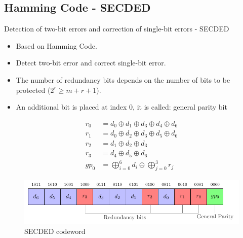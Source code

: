 \subsection{Hamming Code - SECDED}
\begin{frame}{Detection of two-bit errors and correction of single-bit errors - SECDED}
    \begin{block}{}
        \begin{itemize}
            \justifying
            \item Based on Hamming Code.
            \item Detect two-bit error and correct single-bit error.
            \item The number of redundancy bits depends on the number of bits to be protected {\scriptsize ($ 2^r \ge m + r + 1 $)}.
            \item An additional bit is placed at index 0, it is called: general parity bit
        \end{itemize}
    \end{block}

    \begin{minipage}[c]{0.4\linewidth}
        \begin{equation} \label{equat:secded_encoder}
            \begin{split}
                r_{0}  &= d_{0} \oplus d_{1} \oplus d_{3} \oplus d_{4} \oplus d_{6} \\
                r_{1}  &= d_{0} \oplus d_{2} \oplus d_{3} \oplus d_{5} \oplus d_{6} \\
                r_{2}  &= d_{1} \oplus d_{2} \oplus d_{3} \\
                r_{3}  &= d_{4} \oplus d_{5} \oplus d_{6} \\
                gp_{0} &= \bigoplus_{i=0}^{6} d_{i} \oplus \bigoplus_{j=0}^{3} r_{j}
            \end{split}
        \end{equation}
    \end{minipage}\hfill%
    \begin{minipage}[c]{0.6\linewidth}
        \begin{figure}
            \centering
            \includegraphics[width=\textwidth, page=1]{src/3_strategies/img/secded.pdf}
            \caption{SECDED codeword}
            \label{fig:secded_codeword}
        \end{figure}
    \end{minipage}
\end{frame}
    
